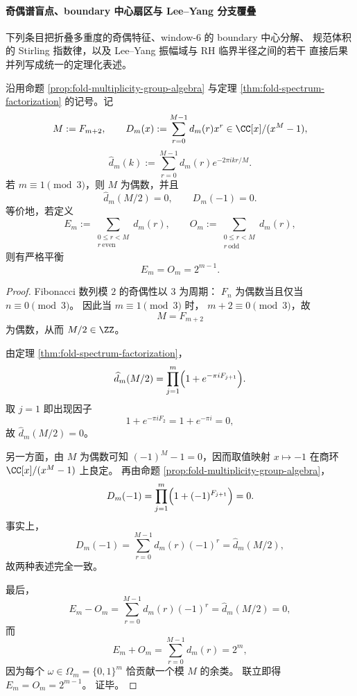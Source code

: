 
\paragraph{奇偶谱盲点、boundary 中心扇区与 Lee--Yang 分支覆叠}
下列条目把折叠多重度的奇偶特征、window-\(6\) 的 boundary 中心分解、
规范体积的 Stirling 指数律，以及 Lee--Yang 振幅域与 RH 临界半径之间的若干
直接后果并列写成统一的定理化表述。

\begin{theorem}[折叠多重度的严格奇偶平衡]\label{thm:xi-fold-multiplicity-strict-parity-balance}
沿用命题 \ref{prop:fold-multiplicity-group-algebra} 与定理 \ref{thm:fold-spectrum-factorization}
的记号。记
\[
M:=F_{m+2},
\qquad
D_m(x):=\sum_{r=0}^{M-1}d_m(r)x^r\in \CC[x]/(x^M-1),
\]
\[
\widehat d_m(k):=\sum_{r=0}^{M-1} d_m(r)e^{-2\pi i kr/M}.
\]
若 \(m\equiv 1\pmod 3\)，则 \(M\) 为偶数，并且
\[
\boxed{\;
\widehat d_m(M/2)=0,
\qquad
D_m(-1)=0.\;}
\]
等价地，若定义
\[
E_m:=\sum_{\substack{0\le r<M\\ r\ \mathrm{even}}}d_m(r),
\qquad
O_m:=\sum_{\substack{0\le r<M\\ r\ \mathrm{odd}}}d_m(r),
\]
则有严格平衡
\[
\boxed{\;
E_m=O_m=2^{m-1}.\;}
\]
\end{theorem}
\begin{proof}
Fibonacci 数列模 \(2\) 的奇偶性以 \(3\) 为周期：
\(
F_n
\)
为偶数当且仅当
\(
n\equiv 0\pmod 3
\)。
因此当 \(m\equiv 1\pmod 3\) 时，
\(
m+2\equiv 0\pmod 3
\)，故
\[
M=F_{m+2}
\]
为偶数，从而
\(
M/2\in \ZZ
\)。
\par
由定理 \ref{thm:fold-spectrum-factorization}，
\[
\widehat d_m(M/2)
=
\prod_{j=1}^{m}\Bigl(1+e^{-\pi i F_{j+1}}\Bigr).
\]
取 \(j=1\) 即出现因子
\[
1+e^{-\pi i F_2}=1+e^{-\pi i}=0,
\]
故
\(
\widehat d_m(M/2)=0
\)。
\par
另一方面，由 \(M\) 为偶数可知
\(
(-1)^M-1=0
\)，因而取值映射 \(x\mapsto -1\) 在商环
\(
\CC[x]/(x^M-1)
\)
上良定。
再由命题 \ref{prop:fold-multiplicity-group-algebra}，
\[
D_m(-1)
=
\prod_{j=1}^{m}\Bigl(1+(-1)^{F_{j+1}}\Bigr)=0.
\]
事实上，
\[
D_m(-1)=\sum_{r=0}^{M-1}d_m(r)(-1)^r=\widehat d_m(M/2),
\]
故两种表述完全一致。
\par
最后，
\[
E_m-O_m=\sum_{r=0}^{M-1}d_m(r)(-1)^r=\widehat d_m(M/2)=0,
\]
而
\[
E_m+O_m=\sum_{r=0}^{M-1}d_m(r)=2^m,
\]
因为每个 \(\omega\in\Omega_m=\{0,1\}^m\) 恰贡献一个模 \(M\) 的余类。
联立即得
\(
E_m=O_m=2^{m-1}
\)。
证毕。
\end{proof}

